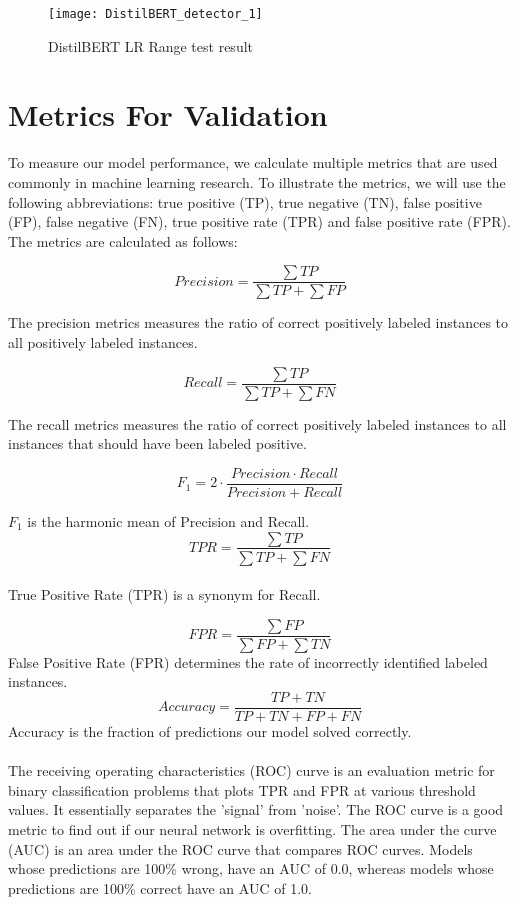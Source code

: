 \begin{figure}[!htb]
    \texttt{[image: DistilBERT\_detector\_1]}
    \caption{DistilBERT LR Range test result}
    \label{figure_lr}
\end{figure}
\pagebreak

\section{Metrics For Validation}
To measure our model performance, we calculate multiple metrics that are used commonly in machine learning research. To illustrate the metrics, we will use the following abbreviations: true positive (TP), true negative (TN), false positive (FP), false negative (FN), true positive rate (TPR) and false positive rate (FPR). The metrics are calculated as follows:

$${
            Precision = \frac{\sum TP}{\sum TP + \sum FP}
        }
$$

The precision metrics measures the ratio of correct positively labeled instances to all positively labeled instances.

$${
            Recall = \frac{\sum TP}{\sum TP + \sum FN}
        }
$$

The recall metrics measures the ratio of correct positively labeled instances to all instances that should have been labeled positive.

$${
            F_1 = 2 \cdot \frac{Precision \cdot Recall}{Precision + Recall}
        }
$$

$F_1$ is the harmonic mean of Precision and Recall.
\pagebreak
$${
            TPR = \frac{\sum TP}{\sum TP + \sum FN}
        }
$$
\\True Positive Rate (TPR) is a synonym for Recall.

$${
            FPR = \frac{\sum FP}{\sum FP + \sum TN}
        }
$$
False Positive Rate (FPR) determines the rate of incorrectly identified labeled instances.
$${
            Accuracy = \frac{TP + TN}{TP + TN + FP + FN}
        }
$$
Accuracy is the fraction of predictions our model solved correctly.
\\\\
The receiving operating characteristics (ROC) curve is an evaluation metric for binary classification problems that plots TPR and FPR at various threshold values. It essentially separates the 'signal' from 'noise'. The ROC curve is a good metric to find out if our neural network is overfitting. The area under the curve (AUC) is an area under the ROC curve that compares ROC curves. Models whose predictions are 100\% wrong, have an AUC of 0.0, whereas models whose predictions are 100\% correct have an AUC of 1.0.

